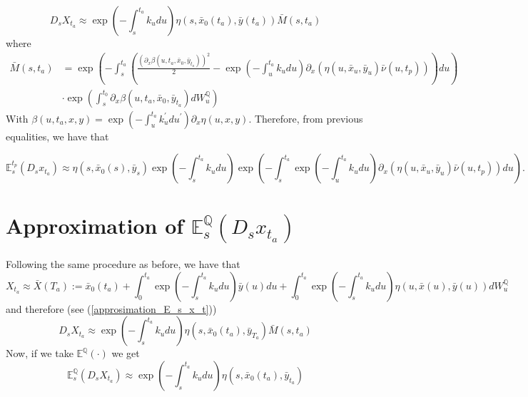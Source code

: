 \documentclass[a4paper,10pt]{article}
\newcommand{\1}{\mathbf{1}}
\begin{document}
\begin{equation}\label{approximation_D_s_x_t}
D_sX_{t_a} \approx  \exp\left(-\int_{s}^{t_a}k_u du \right) \eta(s,\bar{x}_0(t_a),\bar{y}(t_a))\bar{M}(s,t_a)
\end{equation}
where
\begin{align*}
\bar{M}(s,t_a) &= \exp\left(-\int_{s}^{t_a} \left( \frac{\left(\partial_x \beta(u,t_a,\bar{x}_0,\bar{y}_{t_a})\right)^{2}}{2} - \exp\left(-\int_{u}^{t_a}k_u du\right) \partial_x (\eta(u, \bar{x}_u, \bar{y}_{u}) \bar{\nu}(u,t_p))\right) du \right) \\ 
&\cdot\exp\left(\int_{s}^{t_0} \partial_x \beta(u,t_a,\bar{x}_0,\bar{y}_{t_a}) dW^{\mathbb{Q}}_u \right)
\end{align*}
With $\beta(u,t_a,x,y) = \exp\left(-\int_{u}^{t_a}k_u^{\prime} du^{\prime}\right) \partial_x \eta(u,x,y)$. Therefore, from previous equalities, we have that

\begin{equation}\label{approsimation_E_s_x_t}
\mathbb{E}_s^{t_p}\left(D_s x_{t_a}\right) \approx \eta(s,\bar{x}_0(s),\bar{y}_s) \exp\left(-\int_{s}^{t_a}k_u du \right) \exp\left(-\int_{s}^{t_a} \exp\left(-\int_{u}^{t_a}k_u du\right)\partial_x (\eta(u, \bar{x}_u, \bar{y}_{u}) \bar{\nu}(u,t_p)) du \right).
\end{equation}

\section{Approximation of $\mathbb{E}_s^{\mathbb{Q}}\left(D_s x_{t_a}\right)$}
Following the same procedure as before, we have that
\begin{equation*}
X_{t_a} \approx \bar{X}(T_a):= \bar{x}_0(t_a)  + \int_{0}^{t_a} \exp\left(-\int_{s}^{t_a}k_u du\right) \bar{y}(u) du + \int_{0}^{t_a}  \exp\left(-\int_{s}^{t_a}k_u du \right) \eta(u,\bar{x}(u),\bar{y}(u)) dW_u^{\mathbb{Q}}  
\end{equation*}
and therefore (see (\ref{approsimation_E_s_x_t}))
\begin{equation}
D_sX_{t_a} \approx  \exp\left(-\int_{s}^{t_a}k_u du \right) \eta(s,\bar{x}_0(t_a),\bar{y}_{T_a})\bar{M}(s,t_a)
\end{equation}
Now, if we take $\mathbb{E}^{\mathbb{Q}}\left(\cdot\right)$ we get
\begin{equation}\label{approximation_spot_E_s_x_t}
\mathbb{E}^{\mathbb{Q}}_s\left(D_sX_{t_a} \right) \approx \exp\left(-\int_{s}^{t_a}k_u du \right) \eta(s,\bar{x}_0(t_a),\bar{y}_{t_a})
\end{equation} 
\end{document}
